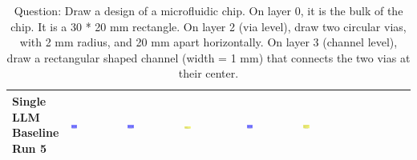 \begin{table}
\begin{tabular}{@{}mmmmmm@{}}
    \makecell{Single LLM \\ Baseline \\ Run 5} & \includegraphics[width=0.13\textwidth]{./run_5/png/gpt-4o_results/MicrofluidicChip.png} & \includegraphics[width=0.13\textwidth]{./run_5/png/o1-preview_results/MicrofluidicChip.png} & \includegraphics[width=0.13\textwidth]{./run_5/png/claude-3-5-sonnet-20240620_results/MicrofluidicChip.png} & \includegraphics[width=0.13\textwidth]{./run_5/png/watsonx_meta-llama_llama-3-1-70b-instruct_results/MicrofluidicChip.png} & \includegraphics[width=0.13\textwidth]{./run_5/png/watsonx_meta-llama_llama-3-405b-instruct_results/MicrofluidicChip.png} \\
    \bottomrule
  \end{tabular}
  \caption*{Question: Draw a design of a microfluidic chip. On layer 0, it is the bulk of the chip. It is a 30 * 20 mm rectangle. On layer 2 (via level), draw two circular vias, with 2 mm radius, and 20 mm apart horizontally. On layer 3 (channel level), draw a rectangular shaped channel (width = 1 mm) that connects the two vias at their center.}
\end{table}

